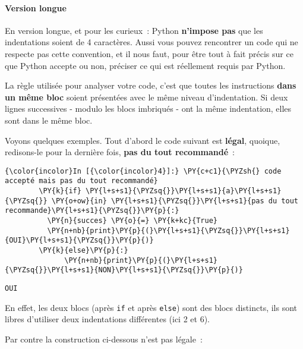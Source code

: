     \hypertarget{version-longue}{%
\paragraph{Version longue}\label{version-longue}}

    En version longue, et pour les curieux~: Python \textbf{n'impose pas}
que les indentations soient de 4 caractères. Aussi vous pouvez
rencontrer un code qui ne respecte pas cette convention, et il nous
faut, pour être tout à fait précis sur ce que Python accepte ou non,
préciser ce qui est réellement requis par Python.

    La règle utilisée pour analyser votre code, c'est que toutes les
instructions \textbf{dans un même bloc} soient présentées avec le même
niveau d'indentation. Si deux lignes successives - modulo les blocs
imbriqués - ont la même indentation, elles sont dans le même bloc.

Voyons quelques exemples. Tout d'abord le code suivant est
\textbf{légal}, quoique, redisons-le pour la dernière fois, \textbf{pas
du tout recommandé}~:

    \begin{Verbatim}[commandchars=\\\{\}]
{\color{incolor}In [{\color{incolor}4}]:} \PY{c+c1}{\PYZsh{} code accepté mais pas du tout recommandé}
        \PY{k}{if} \PY{l+s+s1}{\PYZsq{}}\PY{l+s+s1}{a}\PY{l+s+s1}{\PYZsq{}} \PY{o+ow}{in} \PY{l+s+s1}{\PYZsq{}}\PY{l+s+s1}{pas du tout recommande}\PY{l+s+s1}{\PYZsq{}}\PY{p}{:}
          \PY{n}{succes} \PY{o}{=} \PY{k+kc}{True}
          \PY{n+nb}{print}\PY{p}{(}\PY{l+s+s1}{\PYZsq{}}\PY{l+s+s1}{OUI}\PY{l+s+s1}{\PYZsq{}}\PY{p}{)}
        \PY{k}{else}\PY{p}{:}
              \PY{n+nb}{print}\PY{p}{(}\PY{l+s+s1}{\PYZsq{}}\PY{l+s+s1}{NON}\PY{l+s+s1}{\PYZsq{}}\PY{p}{)}
\end{Verbatim}


    \begin{Verbatim}[commandchars=\\\{\}]
OUI

    \end{Verbatim}

    En effet, les deux blocs (après \texttt{if} et après \texttt{else}) sont
des blocs distincts, ils sont libres d'utiliser deux indentations
différentes (ici 2 et 6).

    Par contre la construction ci-dessous n'est pas légale~:


